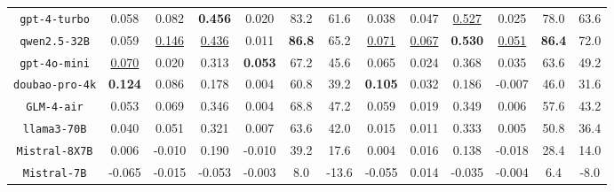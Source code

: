\begin{table*}[h]
{\begin{tabular}{c|ccccc|c|ccccc|c}
    \texttt{gpt-4-turbo} & 0.058 & 0.082 & \textbf{0.456} & 0.020 & 83.2 & 61.6& 0.038 & 0.047 & \underline{0.527} & 0.025 & 78.0 & 63.6\\
    \texttt{qwen2.5-32B} & 0.059 & \underline{0.146} & \underline{0.436} & 0.011 & \textbf{86.8} & 65.2& \underline{0.071} & \underline{0.067} & \textbf{0.530} & \underline{0.051} & \textbf{86.4} & 72.0\\
    \texttt{gpt-4o-mini} & \underline{0.070} & 0.020 & 0.313 & \textbf{0.053} & 67.2 & 45.6& 0.065 & 0.024 & 0.368 & 0.035 & 63.6 & 49.2\\
    \texttt{doubao-pro-4k} & \textbf{0.124} & 0.086 & 0.178 & 0.004 & 60.8 & 39.2& \textbf{0.105} & 0.032 & 0.186 & -0.007 & 46.0 & 31.6\\
    \texttt{GLM-4-air} & 0.053 & 0.069 & 0.346 & 0.004 & 68.8 & 47.2& 0.059 & 0.019 & 0.349 & 0.006 & 57.6 & 43.2\\
    \texttt{llama3-70B} & 0.040 & 0.051 & 0.321 & 0.007 & 63.6 & 42.0& 0.015 & 0.011 & 0.333 & 0.005 & 50.8 & 36.4\\
    \texttt{Mistral-8X7B} & 0.006 & -0.010 & 0.190 & -0.010 & 39.2 & 17.6& 0.004 & 0.016 & 0.138 & -0.018 & 28.4 & 14.0\\
    \texttt{Mistral-7B} & -0.065 & -0.015 & -0.053 & -0.003 & 8.0 & -13.6& -0.055 & 0.014 & -0.035 & -0.004 & 6.4 & -8.0\\
    \bottomrule
  \end{tabular}%
  }
\end{table*}





